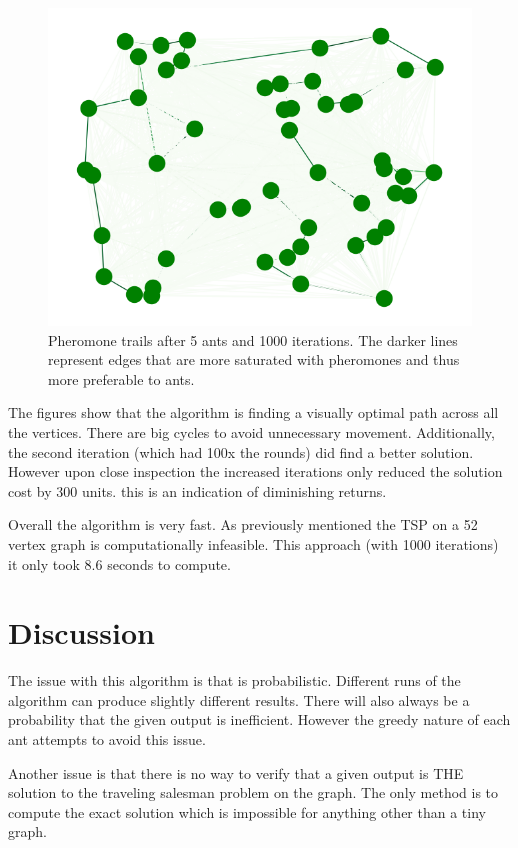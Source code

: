 \documentclass[twocolumn]{article}
\begin{document}
\begin{figure}[t!]
\centering
\includegraphics[width=\linewidth]{Ant_52_nodes_1000_iterations_pheromones.png}
\caption{
    Pheromone trails after 5 ants and 1000 iterations. The darker lines 
    represent edges that are more saturated with pheromones and thus more
    preferable to ants.
}
\label{fig:phermones}
\end{figure}

The figures show that the algorithm is finding a visually optimal path across all the 
vertices. There are big cycles to avoid unnecessary movement. Additionally, the second
iteration (which had 100x the rounds) did find a better solution. However upon close 
inspection the increased iterations only reduced the solution cost by 300 units. this is 
an indication of diminishing returns.

Overall the algorithm is very fast. As previously mentioned the TSP on a 52 vertex graph is 
computationally infeasible. This approach (with 1000 iterations) it only took 8.6 
seconds to compute.


\section{Discussion}
The issue with this algorithm is that is probabilistic. Different runs of the algorithm can produce
slightly different results. There will also always be a probability that the given output is 
inefficient. However the greedy nature of each ant attempts to avoid this issue. 

Another issue is that there is no way to verify that a given output is THE solution to 
the traveling salesman problem on the graph. The only method is to compute the 
exact solution which is impossible for anything other than a tiny graph.
\end{document}
